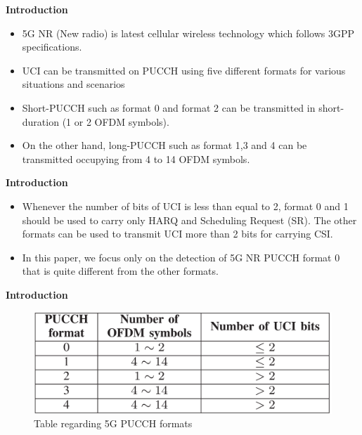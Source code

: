\documentclass{beamer}
\begin{document}
\begin{frame}{\textbf{Introduction}}
\begin{itemize}
   \item 5G NR (New radio) is latest cellular wireless technology which follows 3GPP specifications.
    \item UCI can be transmitted on PUCCH using five different formats for various situations and scenarios 
    \item  Short-PUCCH such as format 0 and
    format 2 can be transmitted in short-duration (1 or 2 OFDM symbols).
    \item On the other hand, long-PUCCH such as format
    1,3 and 4 can be transmitted occupying from 4 to 14 OFDM symbols.
    \end{itemize}
    \end{frame}
\begin{frame}{\textbf{Introduction}}
\begin{itemize}
    \item  Whenever the number of bits of UCI is
less than equal to 2, format 0 and 1 should be used to carry only HARQ and Scheduling Request (SR). The other formats can be used to transmit UCI more than 2 bits for carrying CSI.
    \item In this paper, we focus only on the detection of 5G NR PUCCH format 0 that is quite different from the other formats.
    \end{itemize}
    
\end{frame}
     
    

    

\begin{frame}{\textbf{Introduction}}
    \begin{figure}
        \centering
        \includegraphics[scale=0.3     
        ]{TABLE_PUCCH_FORMATS.png}
        \caption{Table regarding 5G PUCCH formats}
    \end{figure}    
\end{frame}
\end{document}
